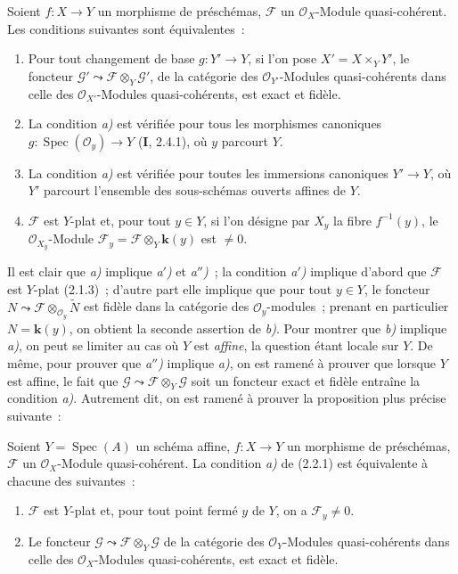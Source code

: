 \begin{proposition}[2.2.1]
\label{IV.2.2.1-fr}
Soient $f:X\to Y$ un morphisme de préschémas, $\mathscr F$ un
$\mathcal O_X$-Module quasi-cohérent. Les conditions suivantes sont
équivalentes~:
\begin{enumerate}
\item[\emph{a)}] Pour tout changement de base $g:Y'\to Y$, si l'on pose
$X'=X\times_Y Y'$, le foncteur
$\mathscr G'\leadsto\mathscr F\otimes_Y\mathscr G'$, de la catégorie des
$\mathcal O_{Y'}$-Modules quasi-cohérents dans celle des
$\mathcal O_{X'}$-Modules quasi-cohérents, est exact et fidèle.
\item[\emph{a$'$)}] La condition \emph{a)} est vérifiée pour tous les
morphismes canoniques $g:\operatorname{Spec}(\mathcal O_y)\to Y$ \textup{(\textbf{I}, 2.4.1)},
où $y$ parcourt $Y$.
\item[\emph{a$''$)}] La condition \emph{a)} est vérifiée pour toutes les
immersions canoniques $Y'\to Y$, où $Y'$ parcourt l'ensemble des
sous-schémas ouverts affines de $Y$.
\item[\emph{b)}] $\mathscr F$ est $Y$-plat et, pour tout $y\in Y$, si l'on
désigne par $X_y$ la fibre $f^{-1}(y)$, le $\mathcal O_{X_y}$-Module
$\mathscr F_y=\mathscr F\otimes_Y \boldsymbol{k}(y)$ est $\neq0$.
\end{enumerate}
\end{proposition}

Il est clair que \emph{a)} implique \emph{a$'$)} et \emph{a$''$)}~; la
condition \emph{a$'$)} implique d'abord que $\mathscr F$ est $Y$-plat
(2.1.3)~; d'autre part elle implique que pour tout $y\in Y$, le foncteur
$N\leadsto\mathscr F\otimes_{\mathcal O_y}\widetilde N$ est fidèle dans la
catégorie des $\mathcal O_y$-modules~; prenant en particulier $N=\boldsymbol{k}(y)$, on
obtient la seconde assertion de \emph{b)}. Pour montrer que \emph{b)}
implique \emph{a)}, on peut se limiter au cas où $Y$ est \emph{affine}, la
question étant locale sur $Y$. De même, pour prouver que \emph{a$''$)}
implique \emph{a)}, on est ramené à prouver que lorsque $Y$ est affine, le
fait que $\mathscr G\leadsto\mathscr F\otimes_Y\mathscr G$ soit un foncteur
exact et fidèle entraîne la condition \emph{a)}. Autrement dit, on est ramené
à prouver la proposition plus précise suivante~:

\begin{proposition}[2.2.2]
\label{IV.2.2.2-fr}
Soient $Y=\operatorname{Spec}(A)$ un schéma affine, $f:X\to Y$ un morphisme
de préschémas, $\mathscr F$ un $\mathcal O_X$-Module quasi-cohérent. La
condition \emph{a)} de \textup{(2.2.1)} est équivalente à chacune des suivantes~:
\begin{enumerate}
\item[\emph{b$'$)}] $\mathscr F$ est $Y$-plat et, pour tout point \textup{fermé} $y$
de $Y$, on a $\mathscr F_y\neq0$.
\item[\emph{c)}] Le foncteur
$\mathscr G\leadsto\mathscr F\otimes_Y\mathscr G$ de la catégorie des
$\mathcal O_Y$-Modules quasi-cohérents dans celle des
$\mathcal O_X$-Modules quasi-cohérents, est exact et fidèle.
\end{enumerate}
\end{proposition}

